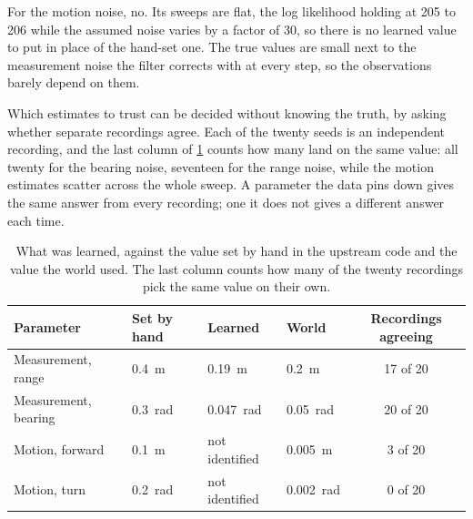 For the motion noise, no. Its sweeps are flat, the log likelihood holding at 205 to 206 while the assumed noise
varies by a factor of 30, so there is no learned value to put in place of the hand-set one. The true values are
small next to the measurement noise the filter corrects with at every step, so the observations barely depend on
them.

Which estimates to trust can be decided without knowing the truth, by asking whether separate recordings agree.
Each of the twenty seeds is an independent recording, and the last column of \cref{tab:learned} counts how many
land on the same value: all twenty for the bearing noise, seventeen for the range noise, while the motion
estimates scatter across the whole sweep. A parameter the data pins down gives the same answer from every
recording; one it does not gives a different answer each time.

\begin{table}[!ht]
  \centering\small
  \caption{What was learned, against the value set by hand in the upstream code and the value the world used.
    The last column counts how many of the twenty recordings pick the same value on their own.}\label{tab:learned}
  \begin{tabular}{@{}l l l l c@{}}
    \toprule
    Parameter & Set by hand & Learned & World & Recordings agreeing \\
    \midrule
    Measurement, range   & \SI{0.4}{\meter}   & \SI{0.19}{\meter}  & \SI{0.2}{\meter}    & 17 of 20 \\
    Measurement, bearing & \SI{0.3}{\radian}  & \SI{0.047}{\radian}& \SI{0.05}{\radian}  & 20 of 20 \\
    Motion, forward      & \SI{0.1}{\meter}   & not identified     & \SI{0.005}{\meter}  & 3 of 20 \\
    Motion, turn         & \SI{0.2}{\radian}  & not identified     & \SI{0.002}{\radian} & 0 of 20 \\
    \bottomrule
  \end{tabular}
\end{table}


